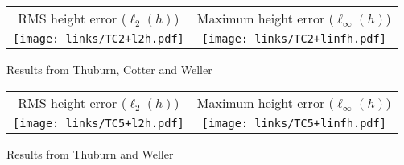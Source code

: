 \begin{slide}

\begin{tabular}{cc}
RMS height error ($\ell_2(h)$)
&
Maximum height error ($\ell_\infty(h)$)
\\
\texttt{[image: links/TC2+l2h.pdf]}
&
\texttt{[image: links/TC2+linfh.pdf]}
\end{tabular}

Results from Thuburn, Cotter and Weller

\end{slide}

\begin{slide}

\begin{tabular}{cc}
RMS height error ($\ell_2(h)$)
&
Maximum height error ($\ell_\infty(h)$)
\\
\texttt{[image: links/TC5+l2h.pdf]}
&
\texttt{[image: links/TC5+linfh.pdf]}
\end{tabular}

Results from Thuburn and Weller

\end{slide}

